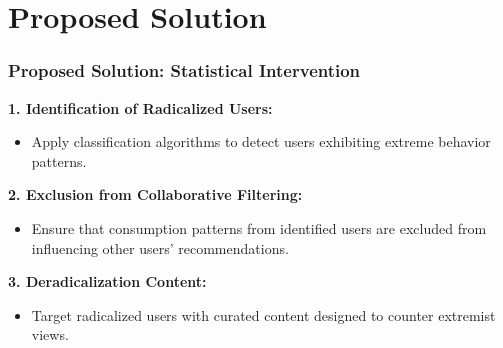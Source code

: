 \documentclass[
	11pt, %
]{beamer}
\begin{document}

\section{Proposed Solution}
\begin{frame}
    \frametitle{Proposed Solution: Statistical Intervention}
    \textbf{1. Identification of Radicalized Users:}
    \begin{itemize}
        \item Apply classification algorithms to detect users exhibiting extreme behavior patterns.
    \end{itemize}

    \textbf{2. Exclusion from Collaborative Filtering:}
    \begin{itemize}
        \item Ensure that consumption patterns from identified users are excluded from influencing other users' recommendations.
    \end{itemize}
    
    \textbf{3. Deradicalization Content:}
    \begin{itemize}
        \item Target radicalized users with curated content designed to counter extremist views.
    \end{itemize}
\end{frame}

\end{document}
